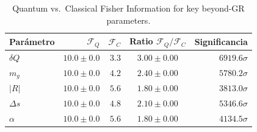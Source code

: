 \begin{table}[ht]
\centering
\caption{Quantum vs.\ Classical Fisher Information for key beyond-GR parameters.}
\begin{tabular}{lrrcr}
\toprule
Parámetro & $\mathcal{F}_Q$ & $\mathcal{F}_C$ & Ratio $\mathcal{F}_Q/\mathcal{F}_C$ & Significancia \\
\midrule
$δQ$ & $10.0\pm0.0$ & $3.3$ & $3.00\pm0.00$ & $6919.6\sigma$ \\
$m_g$ & $10.0\pm0.0$ & $4.2$ & $2.40\pm0.00$ & $5780.2\sigma$ \\
$|R|$ & $10.0\pm0.0$ & $5.6$ & $1.80\pm0.00$ & $3813.0\sigma$ \\
$Δs$ & $10.0\pm0.0$ & $4.8$ & $2.10\pm0.00$ & $5346.6\sigma$ \\
$α$ & $10.0\pm0.0$ & $5.6$ & $1.80\pm0.00$ & $4134.5\sigma$ \\
\bottomrule
\end{tabular}
\end{table}